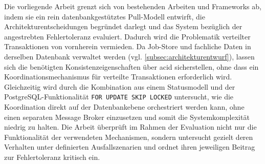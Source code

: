 Die vorliegende Arbeit grenzt sich von bestehenden Arbeiten und Frameworks ab, indem sie ein rein datenbankgestütztes Pull-Modell entwirft,
die Architekturentscheidungen begründet darlegt und das System bezüglich der angestrebten Fehlertoleranz evaluiert.
Dadurch wird die Problematik verteilter Transaktionen von vornherein vermieden.
Da Job-Store und fachliche Daten in derselben Datenbank verwaltet werden (vgl. \cref{subsec:architekturentwurf}),
lassen sich die benötigten Konsistenzeigenschaften über \gls{acid} sicherstellen, ohne dass ein
Koordinationsmechanismus für verteilte Transaktionen erforderlich wird.
Gleichzeitig wird durch die Kombination aus einem Statusmodell und der PostgreSQL-Funktionalität \texttt{FOR UPDATE SKIP LOCKED}
untersucht, wie die Koordination direkt auf der Datenbankebene orchestriert werden kann, ohne einen separaten Message Broker
einzusetzen und somit die Systemkomplexität niedrig zu halten.
Die Arbeit überprüft im Rahmen der Evaluation nicht nur die Funktionalität der verwendeten Mechanismen, sondern untersucht gezielt deren
Verhalten unter definierten Ausfallszenarien und ordnet ihren jeweiligen Beitrag zur Fehlertoleranz kritisch ein.
